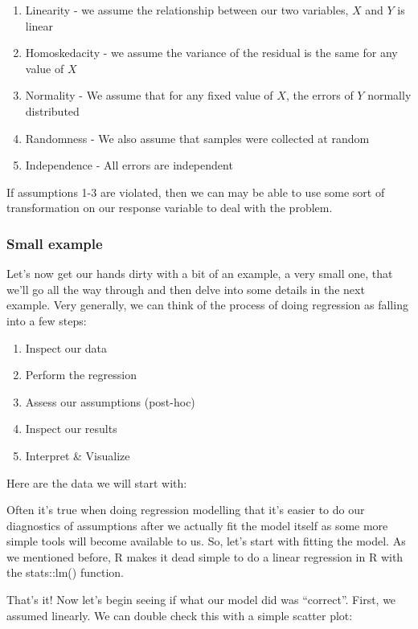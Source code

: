 \documentclass[
]{article}
\begin{document}
\begin{enumerate}
\def\labelenumi{\arabic{enumi}.}
\item
  Linearity - we assume the relationship between our two variables,
  \(X\) and \(Y\) is linear
\item
  Homoskedacity - we assume the variance of the residual is the same for
  any value of \(X\)
\item
  Normality - We assume that for any fixed value of \(X\), the errors of
  \(Y\) normally distributed
\item
  Randomness - We also assume that samples were collected at random
\item
  Independence - All errors are independent
\end{enumerate}

If assumptions 1-3 are violated, then we can may be able to use some
sort of transformation on our response variable to deal with the
problem.

\hypertarget{small-example}{%
\subsubsection{Small example}\label{small-example}}

Let's now get our hands dirty with a bit of an example, a very small
one, that we'll go all the way through and then delve into some details
in the next example. Very generally, we can think of the process of
doing regression as falling into a few steps:

\begin{enumerate}
\def\labelenumi{\arabic{enumi})}
\item
  Inspect our data
\item
  Perform the regression
\item
  Assess our assumptions (post-hoc)
\item
  Inspect our results
\item
  Interpret \& Visualize
\end{enumerate}

Here are the data we will start with:

Often it's true when doing regression modelling that it's easier to do
our diagnostics of assumptions after we actually fit the model itself as
some more simple tools will become available to us. So, let's start with
fitting the model. As we mentioned before, R makes it dead simple to do
a linear regression in R with the stats::lm() function.

That's it! Now let's begin seeing if what our model did was ``correct''.
First, we assumed linearly. We can double check this with a simple
scatter plot:
\end{document}
